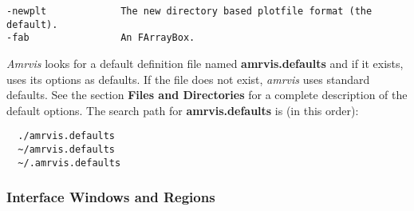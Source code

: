 \begin{verbatim}
-newplt             The new directory based plotfile format (the default).
-fab                An FArrayBox.
\end{verbatim}

{\em Amrvis} looks for a default definition file named  {\bf amrvis.defaults}
and if it exists, uses its options as defaults.
If the file does not exist, {\em amrvis} uses standard defaults.
See the section {\bf Files and Directories} for a complete description
of the default options.
The search path for {\bf amrvis.defaults} is (in this order):

\begin{verbatim}
  ./amrvis.defaults
  ~/amrvis.defaults
  ~/.amrvis.defaults
\end{verbatim}



\subsubsection{Interface Windows and Regions}

